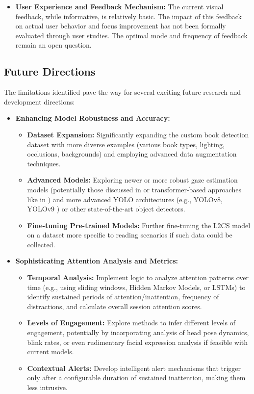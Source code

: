 \begin{itemize}
    \item \textbf{User Experience and Feedback Mechanism:} The current visual feedback, while informative, is relatively basic. The impact of this feedback on actual user behavior and focus improvement has not been formally evaluated through user studies. The optimal mode and frequency of feedback remain an open question.
\end{itemize}

\subsection{Future Directions}
The limitations identified pave the way for several exciting future research and development directions:

\begin{itemize}
    \item \textbf{Enhancing Model Robustness and Accuracy:}
    \begin{itemize}
        \item \textbf{Dataset Expansion:} Significantly expanding the custom book detection dataset with more diverse examples (various book types, lighting, occlusions, backgrounds) and employing advanced data augmentation techniques.
        \item \textbf{Advanced Models:} Exploring newer or more robust gaze estimation models (potentially those discussed in \cite{Kothari_GazeReviewDL_2024} or transformer-based approaches like in \cite{Huang_GazeEstimationTransformer_2023}) and more advanced YOLO architectures (e.g., YOLOv8, YOLOv9 \cite{ultralytics_yolov8_2023, Wang_YOLOv9_2024}) or other state-of-the-art object detectors.
        \item \textbf{Fine-tuning Pre-trained Models:} Further fine-tuning the L2CS model on a dataset more specific to reading scenarios if such data could be collected.
    \end{itemize}

    \item \textbf{Sophisticating Attention Analysis and Metrics:}
    \begin{itemize}
        \item \textbf{Temporal Analysis:} Implement logic to analyze attention patterns over time (e.g., using sliding windows, Hidden Markov Models, or LSTMs) to identify sustained periods of attention/inattention, frequency of distractions, and calculate overall session attention scores.
        \item \textbf{Levels of Engagement:} Explore methods to infer different levels of engagement, potentially by incorporating analysis of head pose dynamics, blink rates, or even rudimentary facial expression analysis if feasible with current models.
        \item \textbf{Contextual Alerts:} Develop intelligent alert mechanisms that trigger only after a configurable duration of sustained inattention, making them less intrusive.
    \end{itemize}


\end{itemize}
